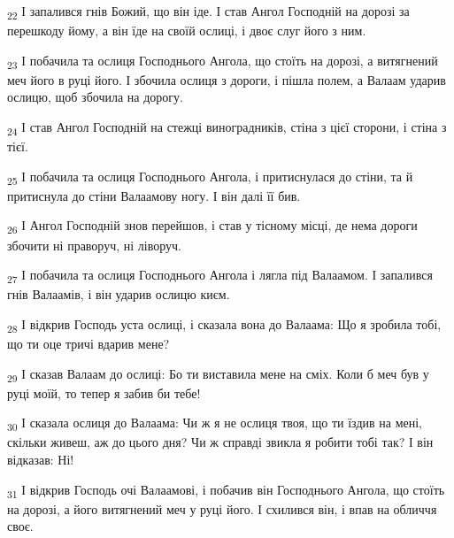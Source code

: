 \begin{tcolorbox}
\textsubscript{22} І запалився гнів Божий, що він іде. І став Ангол Господній на дорозі за перешкоду йому, а він їде на своїй ослиці, і двоє слуг його з ним.
\end{tcolorbox}
\begin{tcolorbox}
\textsubscript{23} І побачила та ослиця Господнього Ангола, що стоїть на дорозі, а витягнений меч його в руці його. І збочила ослиця з дороги, і пішла полем, а Валаам ударив ослицю, щоб збочила на дорогу.
\end{tcolorbox}
\begin{tcolorbox}
\textsubscript{24} І став Ангол Господній на стежці виноградників, стіна з цієї сторони, і стіна з тієї.
\end{tcolorbox}
\begin{tcolorbox}
\textsubscript{25} І побачила та ослиця Господнього Ангола, і притиснулася до стіни, та й притиснула до стіни Валаамову ногу. І він далі її бив.
\end{tcolorbox}
\begin{tcolorbox}
\textsubscript{26} І Ангол Господній знов перейшов, і став у тісному місці, де нема дороги збочити ні праворуч, ні ліворуч.
\end{tcolorbox}
\begin{tcolorbox}
\textsubscript{27} І побачила та ослиця Господнього Ангола і лягла під Валаамом. І запалився гнів Валаамів, і він ударив ослицю києм.
\end{tcolorbox}
\begin{tcolorbox}
\textsubscript{28} І відкрив Господь уста ослиці, і сказала вона до Валаама: Що я зробила тобі, що ти оце тричі вдарив мене?
\end{tcolorbox}
\begin{tcolorbox}
\textsubscript{29} І сказав Валаам до ослиці: Бо ти виставила мене на сміх. Коли б меч був у руці моїй, то тепер я забив би тебе!
\end{tcolorbox}
\begin{tcolorbox}
\textsubscript{30} І сказала ослиця до Валаама: Чи ж я не ослиця твоя, що ти їздив на мені, скільки живеш, аж до цього дня? Чи ж справді звикла я робити тобі так? І він відказав: Ні!
\end{tcolorbox}
\begin{tcolorbox}
\textsubscript{31} І відкрив Господь очі Валаамові, і побачив він Господнього Ангола, що стоїть на дорозі, а його витягнений меч у руці його. І схилився він, і впав на обличчя своє.
\end{tcolorbox}
